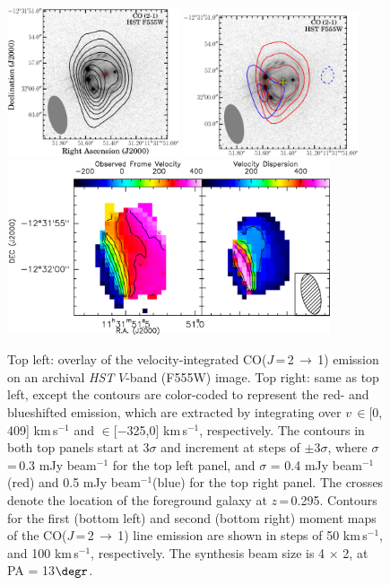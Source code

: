 \documentclass[]{emulateapj}
\newcommand{\rarr}{$\rightarrow$}
\newcommand{\bco}{\mbox{CO($J$\,=\,2\,\rarr\,1)}\xspace}
\newcommand{\kms}{\mbox{km\,s$^{-1}$}\xspace}
\newcommand{\pmOne}{\mbox{$^{-1}$}\xspace}
\begin{document}
\begin{figure}[!htbp]
\hspace{0.5em}
\includegraphics[trim=0 10 15 0, clip, width=0.452\textwidth]{f2a.eps}
\includegraphics[trim=5 -18 0 0, clip, width=0.462\textwidth]{f2b.eps}
\\
\includegraphics[trim=25 16 0 10, clip, width=0.85\textwidth]{f2c.eps}
\vspace{0.1em}
\caption{Top left: overlay of the velocity-integrated \bco emission on an archival {\it HST} $V$-band (F555W)
image.
Top right: same as top left, except the contours are color-coded to represent the red- and blueshifted emission, which
are extracted by integrating over $v$\,$\in$[0, 409] \kms and $\in$[$-$325,0] \kms, respectively.
The contours in both top panels start at 3$\sigma$ and increment at steps of
$\pm$3$\sigma$, where $\sigma$\,=\,0.3 mJy beam\pmOne for the top left panel,
and
$\sigma$ = 0.4 mJy beam\pmOne (red) and 0.5 mJy beam\pmOne (blue)
for the top right panel.
The crosses denote the
location of the foreground galaxy at $z$\,=\,0.295.
Contours for the first (bottom left) and second (bottom right) moment maps of the \bco line emission
are shown in steps of
50 \kms, and 100 \kms, respectively.
The synthesis beam size is 4 $\times$ 2, at PA = 13$\degr$.
\label{fig:CO21mom}}
\end{figure}
\end{document}
